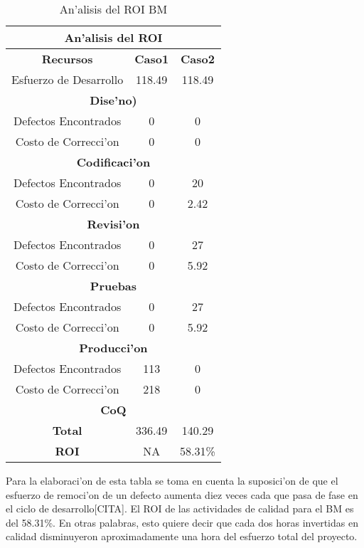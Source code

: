 \begin{table}[htbp]
	\centering
		\begin{tabular}{| c | c | c |}
		  \hline
		  \multicolumn{3}{|c|}{\textbf{An'alisis del ROI}} \\
		  \hline
		  \textbf{Recursos} & \textbf{Caso1} & \textbf{Caso2} \\
		  Esfuerzo de Desarrollo & 118.49 & 118.49 \\
		  \hline
		  \multicolumn{3}{|c|}{\textbf{Dise'no)}} \\
		  \hline
		  Defectos Encontrados & 0 & 0 \\
		  Costo de Correcci'on & 0 & 0 \\
		  \hline
		  \multicolumn{3}{|c|}{\textbf{Codificaci'on}} \\
		  \hline
		  Defectos Encontrados & 0 & 20 \\
		  Costo de Correcci'on & 0 & 2.42 \\
		  \hline
		  \multicolumn{3}{|c|}{\textbf{Revisi'on}} \\
		  \hline
		  Defectos Encontrados & 0 & 27 \\
		  Costo de Correcci'on & 0 & 5.92 \\
		  \multicolumn{3}{|c|}{\textbf{Pruebas}} \\
		  \hline
		  Defectos Encontrados & 0 & 27 \\
		  Costo de Correcci'on & 0 & 5.92 \\
		  \multicolumn{3}{|c|}{\textbf{Producci'on}} \\
		  \hline
		  Defectos Encontrados & 113 & 0 \\
		  Costo de Correcci'on & 218 & 0 \\
		  \hline
		  \hline
		  \multicolumn{3}{|c|}{\textbf{CoQ}} \\
		  \hline
		  \textbf{Total} & 336.49 & 140.29\\
		  \textbf{ROI} & NA & 58.31\% \\
		  \hline
		\end{tabular}
	\caption{An'alisis del ROI BM}
	\label{ROIBM}
\end{table}

Para la elaboraci'on de esta tabla se toma en cuenta la suposici'on de que el esfuerzo de remoci'on de un defecto aumenta diez veces cada que pasa de fase en el ciclo de desarrollo[CITA]. El ROI de las actividades de calidad para el BM es del 58.31\%. En otras palabras, esto quiere decir que cada dos horas invertidas en calidad disminuyeron aproximadamente una hora del esfuerzo total del proyecto.

